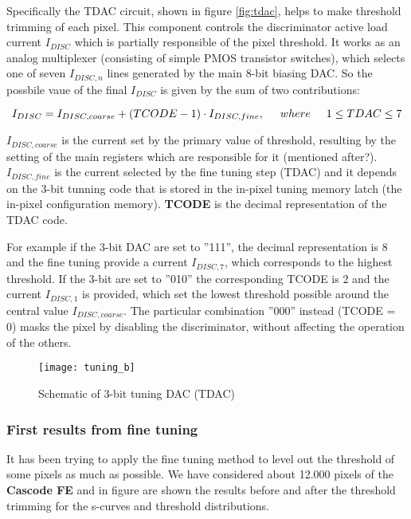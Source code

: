 Specifically the TDAC circuit, shown in figure \vref{fig:tdac}, helps to make threshold trimming of each pixel. This component controls the discriminator active load current $I_{DISC}$ which is partially responsible of the pixel threshold. It works as an analog multiplexer (consisting of simple PMOS transistor switches), which selects one of seven $I_{DISC, n}$ lines generated by the main 8-bit biasing DAC. So the possbile vaue of the final $I_{DISC}$ is given by the sum of two contributions:

\begin{equation}
I_{DISC} = I_{DISC, coarse} + (TCODE - 1) \cdot I_{DISC,fine},  \hspace{.5cm}	where \hspace{.5cm} 1 \leq TDAC \leq 7
\label{tuning_eq}
\end{equation}

\textbf{$I_{DISC, coarse}$} is the current set by the primary value of threshold, resulting by the setting of the main registers which are responsible for it (mentioned after?). 
\textbf{$I_{DISC, fine}$} is the current selected by the fine tuning step (TDAC) and it depends on the 3-bit tunning code that is stored in the in-pixel tuning memory latch (the in-pixel configuration memory).
\textbf{TCODE} is the decimal representation of the TDAC code. 

For example if the 3-bit DAC are set to ''111'', the decimal representation is 8 and the fine tuning provide a current $I_{DISC,7}$, which corresponds to the highest threshold. If the 3-bit are set to ''010'' the corresponding TCODE is 2 and the current $I_{DISC,1}$ is provided,  which set the lowest threshold possible around the central value $I_{DISC,coarse}$. The particular combination ''000'' instead (TCODE = 0) masks the pixel by disabling the discriminator, without affecting the operation of the others.

\begin{figure}
\centering
\texttt{[image: tuning\_b]}
\caption{Schematic of 3-bit tuning DAC (TDAC)}
\label{fig:tdac}
\end{figure}


\subsubsection{First results from fine tuning}

It has been trying to apply the fine tuning method to level out the threshold of some pixels as much as possible. We have considered about 12.000 pixels of the \textbf{Cascode FE} and in figure  are shown the results before and after the threshold trimming for the s-curves and threshold distributions.


